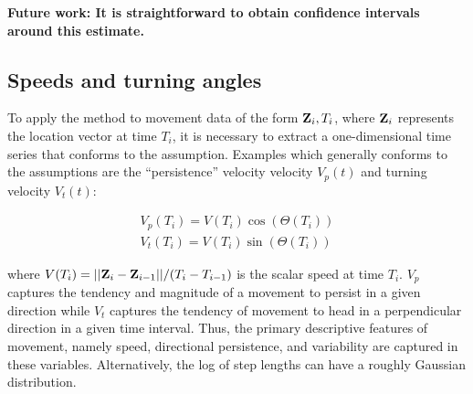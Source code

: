 \documentclass[10pt]{article}\usepackage[]{graphicx}\usepackage[]{color}
\begin{document}
{\bf Future work:  It is straightforward to obtain confidence intervals around this estimate.}

\subsection{Speeds and turning angles}

To apply the method to movement data of the form ${\bf Z}_i,T_i$, where ${\bf Z}_i$ represents the location vector at time $T_i$, it is necessary to extract a one-dimensional time series that conforms to the assumption.  Examples which generally conforms to the assumptions are the ``persistence'' velocity velocity $V_p(t)$ and turning velocity $V_t(t)$:

  \begin{eqnarray}
  	V_p(T_i) = V(T_i) \cos(\Theta(T_i))\\
		V_t(T_i) = V(T_i) \sin(\Theta(T_i))
	\end{eqnarray}

where $V(T_i) = ||{\bf Z}_i - {\bf Z}_{i-1}||/(T_i - T_{i-1})$ is the scalar speed at time $T_i$.  $V_p$ captures the tendency and magnitude of a movement to persist in a given direction while $V_t$ captures the tendency of movement to head in a perpendicular direction in a given time interval.  Thus, the primary descriptive features of movement, namely speed, directional persistence, and variability are captured in these variables.  Alternatively, the log of step lengths can have a roughly Gaussian distribution.
\end{document}
